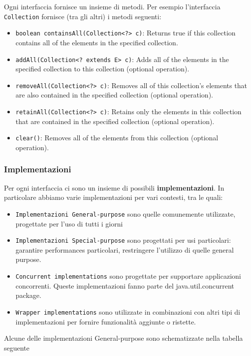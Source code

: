 \documentclass{article}
\begin{document}
Ogni interfaccia fornisce un insieme di metodi. Per esempio l'interfaccia \texttt{Collection} fornisce (tra gli altri) i metodi seguenti:
\begin{itemize}
\item \texttt{boolean	containsAll(Collection<?> c)}: Returns true if this collection contains all of the elements in the specified collection.
\item \texttt{addAll(Collection<? extends E> c)}: Adds all of the elements in the specified collection to this collection (optional operation).
\item \texttt{removeAll(Collection<?> c)}: Removes all of this collection's elements that are also contained in the specified collection (optional operation).
\item \texttt{retainAll(Collection<?> c)}: Retains only the elements in this collection that are contained in the specified collection (optional operation).
\item \texttt{clear()}: Removes all of the elements from this collection (optional operation).
\end{itemize}

\subsubsection{Implementazioni}
Per ogni interfaccia ci sono un insieme di possibili \textbf{implementazioni}. In particolare abbiamo varie implementazioni per vari contesti, tra le quali:
\begin{itemize}
\item \texttt{Implementazioni General-purpose} sono quelle comunemente utilizzate, progettate per l'uso di tutti i giorni
\item \texttt{Implementazioni Special-purpose} sono progettati per usi particolari: garantire performances particolari, restringere l'utilizzo di quelle general purpose.
\item \texttt{Concurrent implementations} sono progettate per supportare applicazioni concorrenti. Queste implementazioni fanno parte del  java.util.concurrent package.
\item \texttt{Wrapper implementations} sono utilizzate in combinazioni con altri tipi di implementazioni per fornire funzionalit\`a aggiunte o ristette.
\end{itemize}

Alcune delle implementazioni General-purpose sono schematizzate nella tabella seguente 
\end{document}

